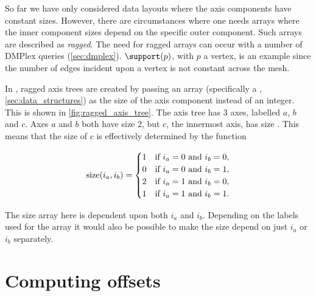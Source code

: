 \documentclass[thesis]{subfiles}
\begin{document}
So far we have only considered data layouts where the axis components have constant sizes.
However, there are circumstances where one needs arrays where the inner component sizes depend on the specific outer component.
Such arrays are described as \textit{ragged}.
The need for ragged arrays can occur with a number of DMPlex queries (\cref{sec:dmplex}).
$\support(p)$, with $p$ a vertex, is an example since the number of edges incident upon a vertex is not constant across the mesh.

In , ragged axis trees are created by passing an array (specifically a , \cref{sec:data_structures}) as the size of the axis component instead of an integer.
This is shown in \cref{fig:ragged_axis_tree}.
The axis tree has 3 axes, labelled $a$, $b$ and $c$.
Axes $a$ and $b$ both have size 2, but $c$, the innermost axis, has size \pycode{[[1, 0], [2, 1]]}.
This means that the size of $c$ is effectively determined by the function

\begin{equation*}
  \textnormal{size}(i_a, i_b) = 
  \begin{cases}
    1 & \textnormal{if}\ i_a = 0\ \textnormal{and}\ i_b = 0, \\
    0 & \textnormal{if}\ i_a = 0\ \textnormal{and}\ i_b = 1, \\
    2 & \textnormal{if}\ i_a = 1\ \textnormal{and}\ i_b = 0, \\
    1 & \textnormal{if}\ i_a = 1\ \textnormal{and}\ i_b = 1.
  \end{cases}
\end{equation*}

The size array here is dependent upon both $i_a$ and $i_b$.
Depending on the labels used for the array it would also be possible to make the size depend on just $i_a$ or $i_b$ separately.

\section{Computing offsets}
\end{document}
